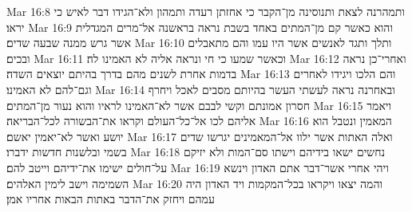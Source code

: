 Mar 16:8  ותמהרנה לצאת ותנוסינה מן־הקבר כי אחזתן רעדה ותמהון ולא־הגידו דבר לאיש כי יראו׃
Mar 16:9  והוא כאשר קם מן־המתים באחד בשבת נראה בראשנה אל־מרים המגדלית אשר גרש ממנה שבעה שדים׃
Mar 16:10  ותלך ותגד לאנשים אשר היו עמו והם מתאבלים ובכים׃
Mar 16:11  וכאשר שמעו כי חי ונראה אליה לא האמינו לה׃
Mar 16:12  ואחרי־כן נראה בדמות אחרת לשנים מהם בדרך בהיתם יוצאים השדה׃
Mar 16:13  והם הלכו ויגידו לאחרים וגם־להם לא האמינו׃
Mar 16:14  ובאחרנה נראה לעשתי העשר בהיותם מסבים לאכל ויחרף חסרון אמונתם וקשי לבבם אשר לא־האמינו לראיו והוא נעור מן־המתים׃
Mar 16:15  ויאמר אליהם לכו אל־כל־העולם וקראו את־הבשורה לכל־הבריאה׃
Mar 16:16  המאמין ונטבל הוא יושע ואשר לא־יאמין יאשם׃
Mar 16:17  ואלה האתות אשר ילוו אל־המאמינים יגרשו שדים בשמי ובלשנות חדשות ידברו׃
Mar 16:18  נחשים ישאו בידיהם וישתו סם־המות ולא יזיקם על־חולים ישימו את־ידיהם וייטב להם׃
Mar 16:19  ויהי אחרי אשר־דבר אתם האדון וינשא השמימה וישב לימין האלהים׃
Mar 16:20  והמה יצאו ויקראו בכל־המקמות ויד האדון היה עמהם ויחזק את־הדבר באתות הבאות אחריו אמן׃


